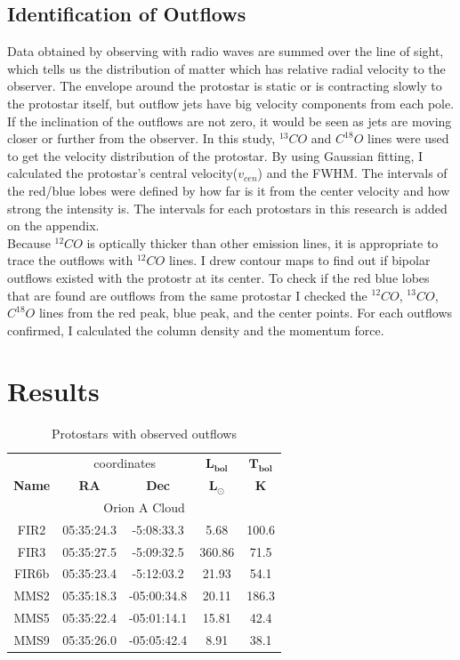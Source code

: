\documentclass[twoside,11pt]{gshs_thesis}
\begin{document}
\subsection{Identification of Outflows}
Data obtained by observing with radio waves are summed over the line of sight, which tells us the distribution of matter which has relative radial velocity to the observer. The envelope around the protostar is static or is contracting slowly to the protostar itself, but outflow jets have big velocity components from each pole. If the inclination of the outflows are not zero, it would be seen as jets are moving closer or further from the observer. In this study, $^{13}CO$ and $C^{18}O$ lines were used to get the velocity distribution of the protostar. By using Gaussian fitting, I calculated the protostar’s central velocity($v_{cen}$) and the FWHM. The intervals of the red/blue lobes were defined by how far is it from the center velocity and how strong the intensity is. The intervals for each protostars in this research is added on the appendix. \\
Because $^{12}CO$ is optically thicker than other emission lines, it is appropriate to trace the outflows with $^{12}CO$ lines. I drew contour maps to find out if bipolar outflows existed with the protostr at its center. To check if the red blue lobes that are found are outflows from the same protostar I checked the $^{12}CO$, $^{13}CO$, $C^{18}O$ lines from the red peak, blue peak, and the center points. For each outflows confirmed, I calculated the column density and the momentum force. \\

\newpage

\section{Results}

\begin{table}[h!]
	\begin{center}
		\begin{tabular}{c|c|c|c|c}
			\toprule
			& \multicolumn{2}{c|}{coordinates} & $\mathbf{L_{bol}}$ & $\mathbf{T_{bol}}$\\
			\textbf{Name} & \textbf{RA} & \textbf{Dec} & $\mathbf{L_{\odot}}$ & $\mathbf{K}$\\
			\midrule
			\multicolumn{5}{c}{Orion A Cloud}\\
			\midrule
			\centering
			FIR2 & 05:35:24.3 & -5:08:33.3 & 5.68 & 100.6\\
			FIR3 & 05:35:27.5 & -5:09:32.5 & 360.86 & 71.5\\
			FIR6b & 05:35:23.4 & -5:12:03.2 & 21.93 & 54.1\\
			MMS2 & 05:35:18.3 & -05:00:34.8 & 20.11 & 186.3\\
			MMS5 & 05:35:22.4 & -05:01:14.1 & 15.81 & 42.4\\
			MMS9 & 05:35:26.0 & -05:05:42.4 & 8.91 & 38.1\\
			\midrule
		\end{tabular}
	\end{center}
	\caption{Protostars with observed outflows}
\end{table}
\end{document}
